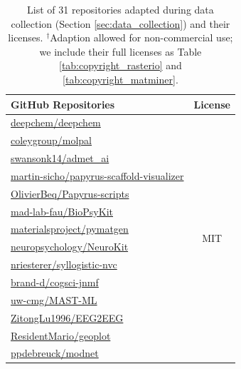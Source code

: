 \begin{table}[h]
\small
\centering
\caption{List of 31 repositories adapted during data collection (Section \ref{sec:data_collection}) and their licenses. $^\dag$Adaption allowed for non-commercial use; we include their full licenses as Table \ref{tab:copyright_rasterio} and \ref{tab:copyright_matminer}.}
\begin{tabular}{lc}
\toprule
\textbf{GitHub Repositories} & \textbf{License}\\
\midrule

\href{https://github.com/deepchem/deepchem}{deepchem/deepchem} & \multirow{14}{*}{MIT} \\
\href{https://github.com/coleygroup/molpal}{coleygroup/molpal} &  \\
\href{https://github.com/swansonk14/admet_ai}{swansonk14/admet\_ai} & \\
\href{https://github.com/martin-sicho/papyrus-scaffold-visualizer}{martin-sicho/papyrus-scaffold-visualizer} & \\
\href{https://github.com/OlivierBeq/Papyrus-scripts}{OlivierBeq/Papyrus-scripts} & \\
\href{https://github.com/mad-lab-fau/BioPsyKit}{mad-lab-fau/BioPsyKit} & \\
\href{https://github.com/materialsproject/pymatgen}{materialsproject/pymatgen} & \\
\href{https://github.com/neuropsychology/NeuroKit}{neuropsychology/NeuroKit} & \\
\href{https://github.com/nriesterer/syllogistic-nvc}{nriesterer/syllogistic-nvc} & \\
\href{https://github.com/brand-d/cogsci-jnmf}{brand-d/cogsci-jnmf} & \\
\href{https://github.com/uw-cmg/MAST-ML}{uw-cmg/MAST-ML} & \\
\href{https://github.com/ZitongLu1996/EEG2EEG}{ZitongLu1996/EEG2EEG} & \\
\href{https://github.com/ResidentMario/geoplot}{ResidentMario/geoplot} & \\
\href{https://github.com/ppdebreuck/modnet}{ppdebreuck/modnet} & \\
\midrule


\end{tabular}
\end{table}
